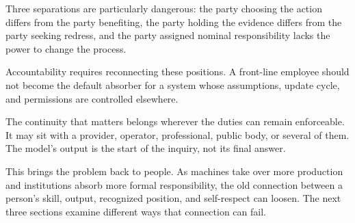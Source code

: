 Three separations are particularly dangerous: the party choosing the action differs from the party benefiting, the party holding the evidence differs from the party seeking redress, and the party assigned nominal responsibility lacks the power to change the process.

Accountability requires reconnecting these positions. A front-line employee should not become the default absorber for a system whose assumptions, update cycle, and permissions are controlled elsewhere.

The continuity that matters belongs wherever the duties can remain enforceable. It may sit with a provider, operator, professional, public body, or several of them. The model's output is the start of the inquiry, not its final answer.

This brings the problem back to people. As machines take over more production and institutions absorb more formal responsibility, the old connection between a person's skill, output, recognized position, and self-respect can loosen. The next three sections examine different ways that connection can fail.
